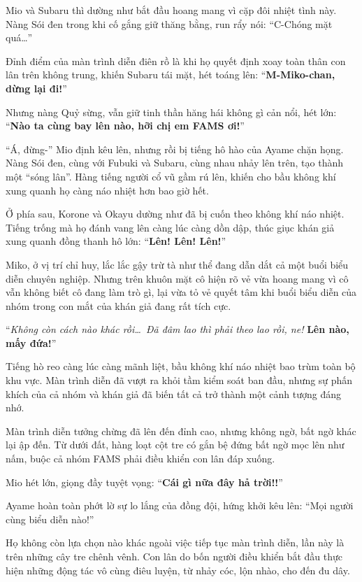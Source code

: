 \documentclass[../main.tex]{subfiles}
\begin{document}
Mio và Subaru thì dường như bắt đầu hoang mang vì cặp đôi nhiệt tình này. Nàng Sói đen trong khi cố gắng giữ thăng bằng, run rẩy nói: ``C-Chóng mặt quá\dots''

Đỉnh điểm của màn trình diễn điên rồ là khi họ quyết định xoay toàn thân con lân trên không trung, khiến Subaru tái mặt, hét toáng lên: ``\textbf{M-Miko-chan, dừng lại đi!}''

Nhưng nàng Quỷ sừng, vẫn giữ tinh thần hăng hái không gì cản nổi, hét lớn: ``\textbf{Nào ta cùng bay lên nào, hỡi chị em FAMS ơi!}''

``Á, đừng-'' Mio định kêu lên, nhưng rồi bị tiếng hô hào của Ayame chặn họng. Nàng Sói đen, cùng với Fubuki và Subaru, cùng nhau nhảy lên trên, tạo thành một ``sóng lân''. Hàng tiếng người cổ vũ gầm rú lên, khiến cho bầu không khí xung quanh họ càng náo nhiệt hơn bao giờ hết.

Ở phía sau, Korone và Okayu dường như đã bị cuốn theo không khí náo nhiệt. Tiếng trống mà họ đánh vang lên càng lúc càng dồn dập, thúc giục khán giả xung quanh đồng thanh hô lớn: ``\textbf{Lên! Lên! Lên!}''

Miko, ở vị trí chỉ huy, lắc lắc gậy trừ tà như thể đang dẫn dắt cả một buổi biểu diễn chuyên nghiệp. Nhưng trên khuôn mặt cô hiện rõ vẻ vừa hoang mang vì cô vẫn không biết cô đang làm trò gì, lại vừa tỏ vẻ quyết tâm khi buổi biểu diễn của nhóm trong con mắt của khán giả đang rất tích cực.

``\textit{Không còn cách nào khác rồi\dots\ Đã đâm lao thì phải theo lao rồi, ne!} \textbf{Lên nào, mấy đứa!}''

Tiếng hò reo càng lúc càng mãnh liệt, bầu không khí náo nhiệt bao trùm toàn bộ khu vực. Màn trình diễn đã vượt ra khỏi tầm kiểm soát ban đầu, nhưng sự phấn khích của cả nhóm và khán giả đã biến tất cả trở thành một cảnh tượng đáng nhớ.

Màn trình diễn tưởng chừng đã lên đến đỉnh cao, nhưng không ngờ, bất ngờ khác lại ập đến. Từ dưới đất, hàng loạt cột tre có gắn bệ đứng bất ngờ mọc lên như nấm, buộc cả nhóm FAMS phải điều khiển con lân đáp xuống.

Mio hét lớn, giọng đầy tuyệt vọng: ``\textbf{Cái gì nữa đây hả trời!!}''

Ayame hoàn toàn phớt lờ sự lo lắng của đồng đội, hứng khởi kêu lên: ``Mọi người cùng biểu diễn nào!''

Họ không còn lựa chọn nào khác ngoài việc tiếp tục màn trình diễn, lần này là trên những cây tre chênh vênh. Con lân do bốn người điều khiển bắt đầu thực hiện những động tác vô cùng điêu luyện, từ nhảy cóc, lộn nhào, cho đến đu dây.
\end{document}
